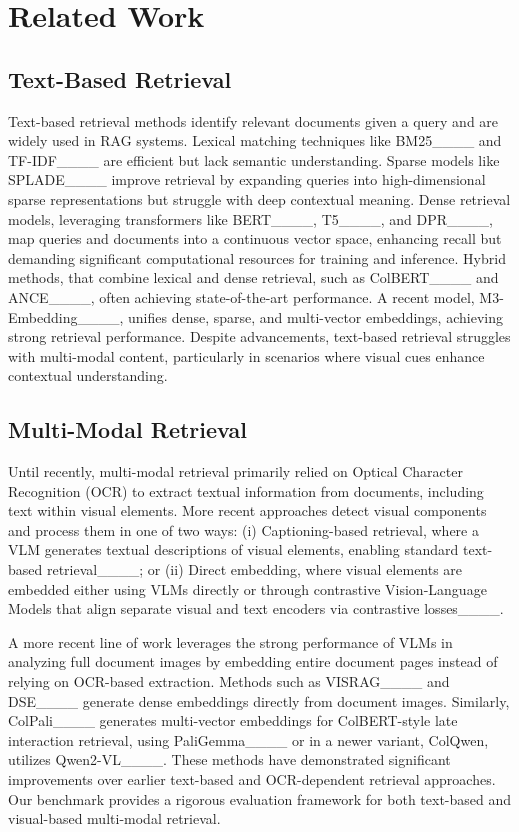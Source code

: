 \section{Related Work}
\label{sec:related_work}





\subsection{Text-Based Retrieval}  

Text-based retrieval methods identify relevant documents given a query and are widely used in RAG systems. Lexical matching techniques like BM25____ and TF-IDF____ are efficient but lack semantic understanding. Sparse models like SPLADE____ improve retrieval by expanding queries into high-dimensional sparse representations but struggle with deep contextual meaning. Dense retrieval models, leveraging transformers like BERT____, T5____, and DPR____, map queries and documents into a continuous vector space, enhancing recall but demanding significant computational resources for training and inference. Hybrid methods, that combine lexical and dense retrieval, such as ColBERT____ and ANCE____, often achieving state-of-the-art performance. A recent model, M3-Embedding____, unifies dense, sparse, and multi-vector embeddings, achieving strong retrieval performance. Despite advancements, text-based retrieval struggles with multi-modal content, particularly in scenarios where visual cues enhance contextual understanding.


\subsection{Multi-Modal Retrieval}

Until recently, multi-modal retrieval primarily relied on Optical Character Recognition (OCR) to extract textual information from documents, including text within visual elements. More recent approaches detect visual components and process them in one of two ways: (i) Captioning-based retrieval, where a VLM generates textual descriptions of visual elements, enabling standard text-based retrieval____; or (ii) Direct embedding, where visual elements are embedded either using VLMs directly or through contrastive Vision-Language Models that align separate visual and text encoders via contrastive losses____.


\vspace{0.1cm}
\noindent
A more recent line of work leverages the strong performance of VLMs in analyzing full document images by embedding entire document pages instead of relying on OCR-based extraction. 
Methods such as VISRAG____ and DSE____ generate dense embeddings directly from document images. Similarly, ColPali____ generates multi-vector embeddings for ColBERT-style late interaction retrieval, using PaliGemma____ or in a newer variant, ColQwen, utilizes Qwen2-VL____.
These methods have demonstrated significant improvements over earlier text-based and OCR-dependent retrieval approaches. Our benchmark provides a rigorous evaluation framework for both text-based and visual-based multi-modal retrieval.

